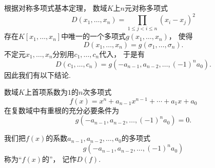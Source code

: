 根据对称多项式基本定理，
数域\(K\)上\(n\)元对称多项式\begin{equation*}
	D(x_1,\dotsc,x_n)
	=\prod_{1\leq j<i\leq n} (x_i-x_j)^2
\end{equation*}
存在\(K[x_1,\dotsc,x_n]\)中唯一的一个多项式\(g(x_1,\dotsc,x_n)\)，
使得\begin{equation*}
	D(x_1,\dotsc,x_n)
	=g(\sigma_1,\dotsc,\sigma_n).
\end{equation*}
不定元\(x_1,\dotsc,x_n\)分别用\(c_1,\dotsc,c_n\)代入，
于是有\begin{equation*}
	D(c_1,\dotsc,c_n)
	=g(-a_{n-1},a_{n-2},\dotsc,(-1)^n a_0).
\end{equation*}
因此我们有以下结论.

\begin{proposition}
数域\(K\)上首项系数为\(1\)的\(n\)次多项式\begin{equation*}
	f(x)=x^n+a_{n-1} x^{n-1}+\dotsb+a_1 x+a_0
\end{equation*}
在复数域中有重根的充分必要条件为\begin{equation*}
	g(-a_{n-1},a_{n-2},\dotsc,(-1)^n a_0)=0.
\end{equation*}
\end{proposition}

我们把\(f(x)\)的系数\(a_{n-1},a_{n-2},\dotsc,a_0\)的多项式\begin{equation*}
	g(-a_{n-1},a_{n-2},\dotsc,(-1)^n a_0)
\end{equation*}称为“\(f(x)\)的”，
记作\(D(f)\).

